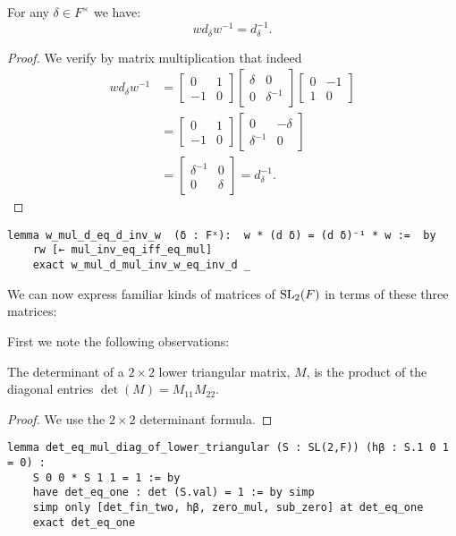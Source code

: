 \begin{lemma}
\label{SpecialMatrices.w_mul_d_eq_d_inv_w}
\leanok
For any $\delta \in F^\times$ we have:
\[ 
w d_\delta w^{-1} = d^{-1}_\delta.
\]
\end{lemma}
\begin{proof} 
\leanok
We verify by matrix multiplication that indeed
\begin{align*}
w d_\delta w^{-1} &= \begin{bmatrix} 0 & 1 \\ - 1 & 0 \end{bmatrix} \begin{bmatrix} \delta & 0 \\ 0 & \delta^{-1} \end{bmatrix} \begin{bmatrix} 0 & - 1 \\ 1 & 0 \end{bmatrix}\\
&=  \begin{bmatrix} 0 & 1 \\ - 1 & 0 \end{bmatrix} \begin{bmatrix} 0 & - \delta \\ \delta^{-1} & 0 \end{bmatrix}\\
&= \! \begin{bmatrix} \delta^{-1} & 0 \\ 0 & \delta \end{bmatrix} \!= d^{-1}_\delta. 
\end{align*}
\end{proof}
\begin{footnotesize}
\begin{verbatim}
lemma w_mul_d_eq_d_inv_w  (δ : Fˣ):  w * (d δ) = (d δ)⁻¹ * w :=  by
    rw [← mul_inv_eq_iff_eq_mul]
    exact w_mul_d_mul_inv_w_eq_inv_d _
\end{verbatim}
\end{footnotesize}

We can now express familiar kinds of matrices of $\operatorname{SL}_2(F)$ in terms of these three matrices:

First we note the following observations:
\begin{corollary}
    \label{det_eq_mul_diag_of_lower_triangular}
    \leanok
    The determinant of a $2 \times 2$ lower triangular matrix, $M$, is the product of the diagonal entries $\det(M) = M_{11} M_{22}$.
\end{corollary}
\begin{proof}
\leanok
We use the $2 \times 2$ determinant formula.
\end{proof}
\begin{footnotesize}
\begin{verbatim}
lemma det_eq_mul_diag_of_lower_triangular (S : SL(2,F)) (hβ : S.1 0 1 = 0) :
    S 0 0 * S 1 1 = 1 := by
    have det_eq_one : det (S.val) = 1 := by simp
    simp only [det_fin_two, hβ, zero_mul, sub_zero] at det_eq_one
    exact det_eq_one
\end{verbatim}
\end{footnotesize}


